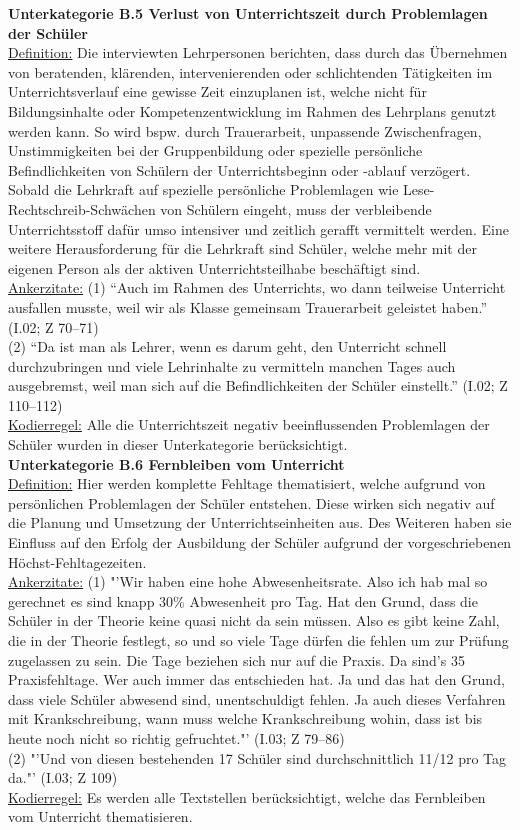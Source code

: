 \textbf{Unterkategorie B.5 Verlust von Unterrichtszeit durch Problemlagen der Schüler}\\
\underline{Definition:} Die interviewten Lehrpersonen berichten, dass durch das Übernehmen von beratenden, klärenden, intervenierenden oder schlichtenden Tätigkeiten im Unterrichtsverlauf eine gewisse Zeit einzuplanen ist, welche nicht für Bildungsinhalte oder Kompetenzentwicklung im Rahmen des Lehrplans genutzt werden kann. So wird bspw. durch Trauerarbeit, unpassende Zwischenfragen, Unstimmigkeiten bei der Gruppenbildung oder spezielle persönliche Befindlichkeiten von Schülern der Unterrichtsbeginn oder -ablauf verzögert. Sobald die Lehrkraft auf spezielle persönliche Problemlagen wie Lese-Rechtschreib-Schwächen von Schülern eingeht, muss der verbleibende Unterrichtsstoff dafür umso intensiver und zeitlich gerafft vermittelt werden. Eine weitere Herausforderung für die Lehrkraft sind Schüler, welche mehr mit der eigenen Person als der aktiven Unterrichtsteilhabe beschäftigt sind.\\
\underline{Ankerzitate:} (1) "`Auch im Rahmen des Unterrichts, wo dann teilweise Unterricht ausfallen musste, weil wir als Klasse gemeinsam Trauerarbeit geleistet haben."' (I.02; Z 70--71)\\ (2) "`Da ist man als Lehrer, wenn es darum geht, den Unterricht schnell durchzubringen und viele Lehrinhalte zu vermitteln manchen Tages auch ausgebremst, weil man sich auf die Befindlichkeiten der Schüler einstellt."' (I.02; Z 110--112)\\
\underline{Kodierregel:} Alle die Unterrichtszeit negativ beeinflussenden Problemlagen der Schüler wurden in dieser Unterkategorie berücksichtigt.\\

\textbf{Unterkategorie B.6 Fernbleiben vom Unterricht}\\
\underline{Definition:} Hier werden komplette Fehltage thematisiert, welche aufgrund von persönlichen Problemlagen der Schüler entstehen. Diese wirken sich negativ auf die Planung und Umsetzung der Unterrichtseinheiten aus. Des Weiteren haben sie Einfluss auf den Erfolg der Ausbildung der Schüler aufgrund der vorgeschriebenen Höchst-Fehltagezeiten.\\
\underline{Ankerzitate:} (1) "'Wir haben eine hohe Abwesenheitsrate. Also ich hab mal so gerechnet es sind knapp 30\% Abwesenheit pro Tag. Hat den Grund, dass die Schüler in der Theorie keine quasi nicht da sein müssen. Also es gibt keine Zahl, die in der Theorie festlegt, so und so viele Tage dürfen die fehlen um zur Prüfung zugelassen zu sein. Die Tage beziehen sich nur auf die Praxis. Da sind's 35 Praxisfehltage. Wer auch immer das entschieden hat. Ja und das hat den Grund, dass viele Schüler abwesend sind, unentschuldigt fehlen. Ja auch dieses Verfahren mit Krankschreibung, wann muss welche Krankschreibung wohin, dass ist bis heute noch nicht so richtig gefruchtet."' (I.03; Z 79--86)\\ (2) "'Und von diesen bestehenden 17 Schüler sind durchschnittlich 11/12 pro Tag da."' (I.03; Z 109)\\
\underline{Kodierregel:} Es werden alle Textstellen berücksichtigt, welche das Fernbleiben vom Unterricht thematisieren.\\

